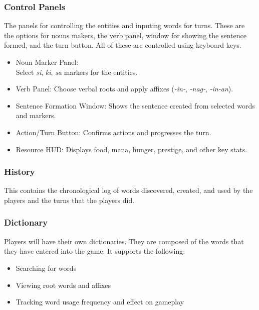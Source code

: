 \documentclass[11pt]{article}
\begin{document}
\subsubsection{Control Panels}
The panels for controlling the entities and inputing words for turns. These are the options for nouns makers, the verb panel, window for showing the sentence formed, and the turn button. All of these are controlled using keyboard keys.
\begin{itemize}
\item Noun Marker Panel:\\
  Select \textit{si}, \textit{ki}, \textit{sa} markers for the entities.
\item Verb Panel: Choose verbal roots and apply affixes (\textit{-in-}, \textit{-nag-}, \textit{-in-an}).
\item Sentence Formation Window: Shows the sentence created from selected words and markers.
\item Action/Turn Button: Confirms actions and progresses the turn.
\item Resource HUD: Displays food, mana, hunger, prestige, and other key stats.
\end{itemize}

\subsubsection{History}
This contains the chronological log of words discovered, created, and used by the players and the turns that the players did.

\subsubsection{Dictionary}
Players will have their own dictionaries. They are composed of the words that they have entered into the game. It supports the following:
\begin{itemize}
\item Searching for words
\item Viewing root words and affixes
\item Tracking word usage frequency and effect on gameplay
\end{itemize}
\end{document}

